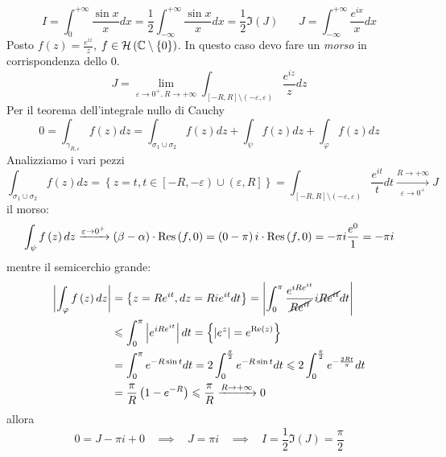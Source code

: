\Soluzione
\begin{equation*}
I = \int ^{ + \infty }_{0}\frac{\sin x}{x} dx = \frac{1}{2}\int ^{ + \infty }_{ - \infty }\frac{\sin x}{x} dx = \frac{1}{2}\Im \left(J\right) \ \ \ \ \ \ \ \ J = \int ^{ + \infty }_{ - \infty }\frac{e^{ix}}{x} dx
\end{equation*}
Posto $f\left(z\right) = \frac{e^{iz}}{z}$, $f\in \Hc \left(\CC  \setminus \left\{0\right\}\right)$. In questo caso devo fare un \textit{morso} in corrispondenza dello $0$.
\begin{equation*}
J = \lim _{\varepsilon \rightarrow 0^{ + } ,R\rightarrow + \infty }\int _{\left[ - R,R\right] \setminus \left(- \varepsilon ,\varepsilon \right)}\frac{e^{iz}}{z} dz
\end{equation*}
Per il teorema dell'integrale nullo di Cauchy
\begin{equation*}
0 = \int _{\gamma _{R,\varepsilon }} f\left(z\right) dz = \int _{\sigma _{1} \cup \sigma _{2}} f\left(z\right) dz + \int _{\psi } f\left(z\right) dz + \int _{\varphi } f\left(z\right) dz
\end{equation*}
Analizziamo i vari pezzi
\begin{equation*}
\int _{\sigma _{1} \cup \sigma _{2}} f\left(z\right) dz = \left\{z = t,t\in \left[ - R, - \varepsilon \right) \cup \left(\varepsilon ,R\right]\right\} = \int _{\left[ - R,R\right] \setminus \left(- \varepsilon ,\varepsilon \right)}\frac{e^{it}}{t} dt\xrightarrow[\varepsilon \rightarrow 0^{ + }]{R\rightarrow + \infty } J
\end{equation*}
il morso:
\begin{equation*}
\int _{\psi } f\left(z\right) dz\xrightarrow{\varepsilon \rightarrow 0^{ + }}\left(\beta - \alpha \right) \cdot \Res \left(f,0\right) = \left(0 - \pi \right) i\cdot \Res \left(f,0\right) = - \pi i\frac{e^{0}}{1} = - \pi i
\end{equation*}
mentre il semicerchio grande:
\begin{align*}
\left| \int _{\varphi } f\left(z\right) dz\right|  & = \left\{z = Re^{it} ,dz = Rie^{it} dt\right\} = \left| \int ^{\pi }_{0}\frac{e^{iRe^{it}}}{\cancel{Re^{it}}} i\cancel{Re^{it}} dt\right| \\
 & \leqslant \int ^{\pi }_{0}\left| e^{iRe^{it}}\right| dt = \left\{\left| e^{z}\right| = e^{\Re \left(z\right)}\right\}\\
 & = \int ^{\pi }_{0} e^{ - R\sin t} dt = 2\int ^{\frac{\pi }{2}}_{0} e^{ - R\sin t} dt\leqslant 2\int ^{\frac{\pi }{2}}_{0} e^{ - \frac{2Rt}{\pi }} dt\\
 & = \frac{\pi }{R}\left(1 - e^{ - R}\right) \leqslant \frac{\pi }{R}\xrightarrow{R\rightarrow + \infty } 0
\end{align*}
allora
\begin{equation*}
0 = J - \pi i + 0\ \ \ \ \implies \ \ \ \ J = \pi i\ \ \ \ \implies \ \ \ \ I = \frac{1}{2}\Im \left(J\right) = \frac{\pi }{2}
\end{equation*}
\Soluzione

